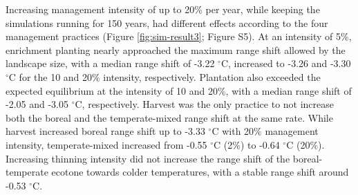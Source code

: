 \documentclass[12pt]{article}
\begin{document}
Increasing management intensity of up to 20\% per year, while keeping
the simulations running for 150 years, had different effects according
to the four management practices (Figure \ref{fig:sim-result3}; Figure
S5). At an intensity of 5\%, enrichment planting nearly approached the
maximum range shift allowed by the landscape size, with a median range
shift of -3.22 \(^{\circ}\)C, increased to -3.26 and -3.30 \(^{\circ}\)C
for the 10 and 20\% intensity, respectively. Plantation also exceeded
the expected equilibrium at the intensity of 10 and 20\%, with a median
range shift of -2.05 and -3.05 \(^{\circ}\)C, respectively. Harvest was
the only practice to not increase both the boreal and the
temperate-mixed range shift at the same rate. While harvest increased
boreal range shift up to -3.33 \(^{\circ}\)C with 20\% management
intensity, temperate-mixed increased from -0.55 \(^{\circ}\)C (2\%) to
-0.64 \(^{\circ}\)C (20\%). Increasing thinning intensity did not
increase the range shift of the boreal-temperate ecotone towards colder
temperatures, with a stable range shift around -0.53 \(^{\circ}\)C.
\end{document}
